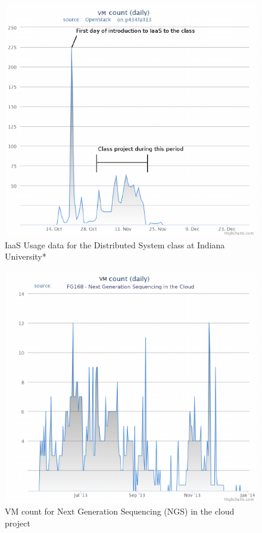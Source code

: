 \documentclass{sig-alternate-05-2015}
\begin{document}
\begin{figure}[htb] 
  \centering 
    \includegraphics[width=1.0\columnwidth]{images/fig1.pdf} 
  \caption{IaaS Usage data for the Distributed System class at Indiana University*}\label{F:fig2} 
\end{figure} 



\begin{figure}[htb] 
  \centering 
    \includegraphics[width=1.0\columnwidth]{images/fig2.pdf} 
  \caption{VM count for Next Generation Sequencing (NGS) in the cloud project}\label{F:fig3} 
\end{figure} 
\end{document}

